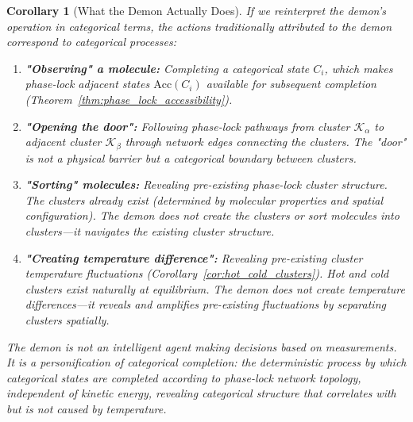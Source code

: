 \documentclass[12pt,a4paper]{article}
\newtheorem{corollary}[theorem]{Corollary}
\theoremstyle{definition}
\theoremstyle{remark}
\newcommand{\accessible}{\text{Acc}}
\begin{document}
\begin{corollary}[What the Demon Actually Does]
\label{cor:demon_actual}
If we reinterpret the demon's operation in categorical terms, the actions traditionally attributed to the demon correspond to categorical processes:
\begin{enumerate}
    \item \textbf{"Observing" a molecule:} Completing a categorical state $C_i$, which makes phase-lock adjacent states $\accessible(C_i)$ available for subsequent completion (Theorem~\ref{thm:phase_lock_accessibility}).

    \item \textbf{"Opening the door":} Following phase-lock pathways from cluster $\mathcal{K}_\alpha$ to adjacent cluster $\mathcal{K}_\beta$ through network edges connecting the clusters. The "door" is not a physical barrier but a categorical boundary between clusters.

    \item \textbf{"Sorting" molecules:} Revealing pre-existing phase-lock cluster structure. The clusters already exist (determined by molecular properties and spatial configuration). The demon does not create the clusters or sort molecules into clusters—it navigates the existing cluster structure.

    \item \textbf{"Creating temperature difference":} Revealing pre-existing cluster temperature fluctuations (Corollary~\ref{cor:hot_cold_clusters}). Hot and cold clusters exist naturally at equilibrium. The demon does not create temperature differences—it reveals and amplifies pre-existing fluctuations by separating clusters spatially.
\end{enumerate}
The demon is not an intelligent agent making decisions based on measurements. It is a personification of categorical completion: the deterministic process by which categorical states are completed according to phase-lock network topology, independent of kinetic energy, revealing categorical structure that correlates with but is not caused by temperature.
\end{corollary}
\end{document}
